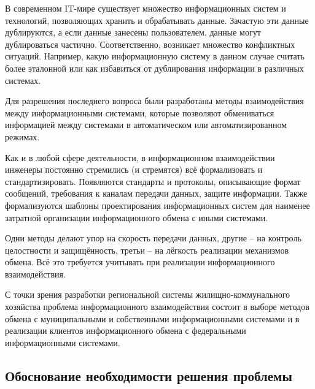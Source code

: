
В современном IT-мире существует множество информационных систем и технологий, позволяющих хранить и обрабатывать данные.
Зачастую эти данные дублируются, а если данные занесены пользователем, данные могут дублироваться частично.
Соответственно, возникает множество конфликтных ситуаций.
Например, какую информационную систему в данном случае считать более эталонной или как избавиться от дублирования информации в различных системах.

Для разрешения последнего вопроса были разработаны методы взаимодействия между информационными системами, которые позволяют обмениваться информацией между системами в автоматическом или автоматизированном режимах.

Как и в любой сфере деятельности, в информационном взаимодействии инженеры постоянно стремились (и стремятся) всё формализовать и стандартизировать.
Появляются стандарты и протоколы, описывающие формат сообщений, требования к каналам передачи данных, защите информации.
Также формализуются шаблоны проектирования информационных систем для наименее затратной организации информационного обмена с иными системами.

Одни методы делают упор на скорость передачи данных, другие -- на контроль целостности и защищённость, третьи -- на лёгкость реализации механизмов обмена.
Всё это требуется учитывать при реализации информационного взаимодействия.

С точки зрения разработки региональной системы жилищно-коммунального хозяйства проблема информационного взаимодействия состоит в выборе методов обмена с муниципальными и собственными информационными системами и в реализации клиентов информационного обмена с федеральными информационными системами. 



\subsection{Обоснование необходимости решения проблемы}

